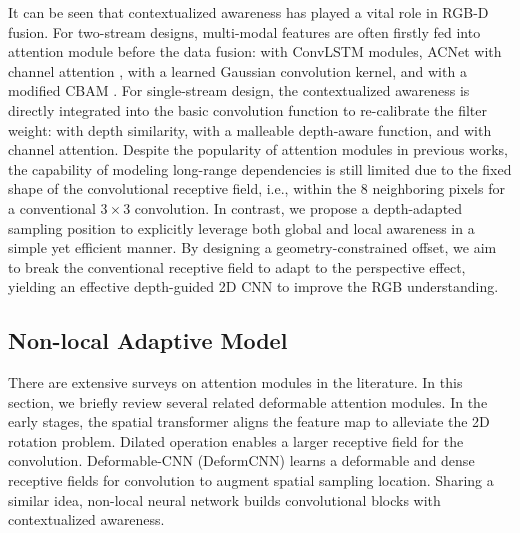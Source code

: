 \documentclass[lettersize,journal]{IEEEtran}
\begin{document}
It can be seen that contextualized awareness has played a vital role in RGB-D fusion. For two-stream designs, multi-modal features are often firstly fed into attention module before the data fusion: \cite{li2016lstm} with ConvLSTM modules, ACNet \cite{hu2019acnet} with channel attention \cite{hu2018senet}, \cite{xiong2020variational} with a learned Gaussian convolution kernel, and \cite{chen2020bi} with a modified CBAM \cite{woo2018cbam}. For single-stream design, the contextualized awareness is directly integrated into the basic convolution function to re-calibrate the filter weight: \cite{Wang2018DCNN} with depth similarity, \cite{xing2020malleable} with a malleable depth-aware function, and \cite{cao2021shapeconv} with channel attention. Despite the popularity of attention modules in previous works, the capability of modeling long-range dependencies is still limited due to the fixed shape of the convolutional receptive field, i.e., within the 8 neighboring pixels for a conventional $3\times 3$ convolution. In contrast, we propose a depth-adapted sampling position to explicitly leverage both global and local awareness in a simple yet efficient manner. By designing a geometry-constrained offset, we aim to break the conventional receptive field to adapt to the perspective effect, yielding an effective depth-guided 2D CNN to improve the RGB understanding.


\subsection{Non-local Adaptive Model}


There are extensive surveys on attention modules in the literature. In this section, we briefly review several related deformable attention modules. In the early stages, the spatial transformer \cite{jaderberg2015spatial} aligns the feature map to alleviate the 2D rotation problem. Dilated operation \cite{yu2015Cascade} enables a larger receptive field for the convolution. Deformable-CNN (DeformCNN) \cite{dai2017deformable} learns a deformable and dense receptive fields for convolution to augment spatial sampling location. Sharing a similar idea, non-local neural network \cite{wang2018non} builds convolutional blocks with contextualized awareness.
\end{document}
